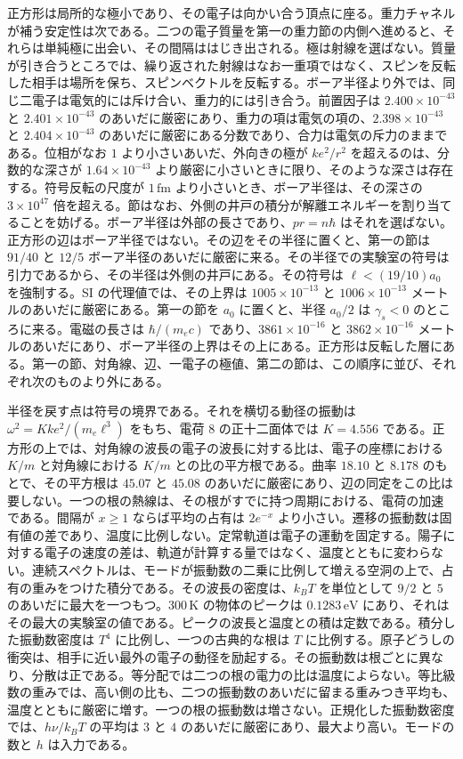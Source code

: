 \documentclass[a4paper]{article}
\begin{document}
正方形は局所的な極小であり、その電子は向かい合う頂点に座る。重力チャネルが補う安定性は次である。二つの電子質量を第一の重力節の内側へ進めると、それらは単純極に出会い、その間隔ははじき出される。極は射線を選ばない。質量が引き合うところでは、繰り返された射線はなお一重項ではなく、スピンを反転した相手は場所を保ち、スピンベクトルを反転する。ボーア半径より外では、同じ二電子は電気的には斥け合い、重力的には引き合う。前置因子は \(2.400\times 10^{-43}\) と \(2.401\times 10^{-43}\) のあいだに厳密にあり、重力の項は電気の項の、\(2.398\times 10^{-43}\) と \(2.404\times 10^{-43}\) のあいだに厳密にある分数であり、合力は電気の斥力のままである。位相がなお \(1\) より小さいあいだ、外向きの極が \(k e^{2}/r^{2}\) を超えるのは、分数的な深さが \(1.64\times 10^{-43}\) より厳密に小さいときに限り、そのような深さは存在する。符号反転の尺度が \(1\,\mathrm{fm}\) より小さいとき、ボーア半径は、その深さの \(3\times 10^{47}\) 倍を超える。節はなお、外側の井戸の積分が解離エネルギーを割り当てることを妨げる。ボーア半径は外部の長さであり、\(pr=n\hbar\) はそれを選ばない。正方形の辺はボーア半径ではない。その辺をその半径に置くと、第一の節は \(91/40\) と \(12/5\) ボーア半径のあいだに厳密に来る。その半径での実験室の符号は引力であるから、その半径は外側の井戸にある。その符号は \(\ell<(19/10)a_0\) を強制する。SI の代理値では、その上界は \(1005\times 10^{-13}\) と \(1006\times 10^{-13}\) メートルのあいだに厳密にある。第一の節を \(a_0\) に置くと、半径 \(a_0/2\) は \(\gamma_s<0\) のところに来る。電磁の長さは \(\hbar/(m_e c)\) であり、\(3861\times 10^{-16}\) と \(3862\times 10^{-16}\) メートルのあいだにあり、ボーア半径の上界はその上にある。正方形は反転した層にある。第一の節、対角線、辺、一電子の極値、第二の節は、この順序に並び、それぞれ次のものより外にある。

半径を戻す点は符号の境界である。それを横切る動径の振動は \(\omega^{2}=K k e^{2}/(m_e\ell^{3})\) をもち、電荷 \(8\) の正十二面体では \(K=4.556\) である。正方形の上では、対角線の波長の電子の波長に対する比は、電子の座標における \(K/m\) と対角線における \(K/m\) との比の平方根である。曲率 \(18.10\) と \(8.178\) のもとで、その平方根は \(45.07\) と \(45.08\) のあいだに厳密にあり、辺の同定をこの比は要しない。一つの根の熱線は、その根がすでに持つ周期における、電荷の加速である。間隔が \(x\ge 1\) ならば平均の占有は \(2e^{-x}\) より小さい。遷移の振動数は固有値の差であり、温度に比例しない。定常軌道は電子の運動を固定する。陽子に対する電子の速度の差は、軌道が計算する量ではなく、温度とともに変わらない。連続スペクトルは、モードが振動数の二乗に比例して増える空洞の上で、占有の重みをつけた積分である。その波長の密度は、\(k_B T\) を単位として \(9/2\) と \(5\) のあいだに最大を一つもつ。\(300\,\mathrm{K}\) の物体のピークは \(0.1283\,\mathrm{eV}\) にあり、それはその最大の実験室の値である。ピークの波長と温度との積は定数である。積分した振動数密度は \(T^{4}\) に比例し、一つの古典的な根は \(T\) に比例する。原子どうしの衝突は、相手に近い最外の電子の動径を励起する。その振動数は根ごとに異なり、分散は正である。等分配では二つの根の電力の比は温度によらない。等比級数の重みでは、高い側の比も、二つの振動数のあいだに留まる重みつき平均も、温度とともに厳密に増す。一つの根の振動数は増さない。正規化した振動数密度では、\(h\nu/k_B T\) の平均は \(3\) と \(4\) のあいだに厳密にあり、最大より高い。モードの数と \(h\) は入力である。
\end{document}

